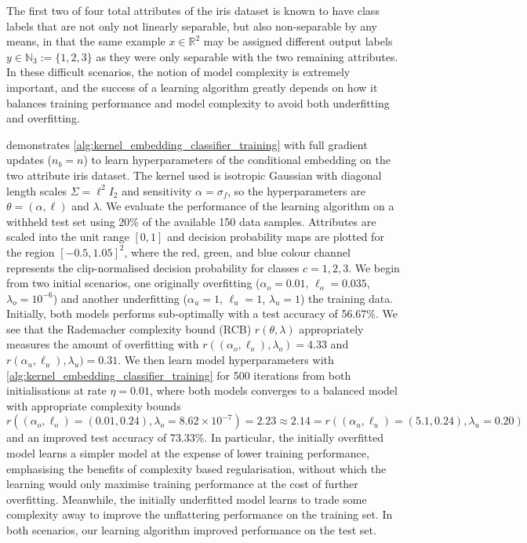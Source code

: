 \documentclass{article}
\begin{document}
		The first two of four total attributes of the iris dataset \citep{fisher1936use} is known to have class labels that are not only not linearly separable, but also non-separable by any means, in that the same example $x \in \mathbb{R}^{2}$ may be assigned different output labels $y \in \mathbb{N}_{3} := \{1, 2, 3\}$ as they were only separable with the two remaining attributes. In these difficult scenarios, the notion of model complexity is extremely important, and the success of a learning algorithm greatly depends on how it balances training performance and model complexity to avoid both underfitting and overfitting. 
		
		 demonstrates \cref{alg:kernel_embedding_classifier_training} with full gradient updates ($n_{b} = n$) to learn hyperparameters of the conditional embedding on the two attribute iris dataset. The kernel used is isotropic Gaussian with diagonal length scales $\Sigma = \ell^{2} I_{2}$ and sensitivity $\alpha = \sigma_{f}$, so the hyperparameters are $\theta = (\alpha, \ell)$ and $\lambda$. We evaluate the performance of the learning algorithm on a withheld test set using 20\% of the available 150 data samples. Attributes are scaled into the unit range $[0, 1]$ and decision probability maps are plotted for the region $[-0.5, 1.05]^{2}$, where the red, green, and blue colour channel represents the clip-normalised decision probability for classes $c = 1, 2, 3$. We begin from two initial scenarios, one originally overfitting ($\alpha_{o} = 0.01$, $\ell_{o} = 0.035$, $\lambda_{o} = 10^{-6}$) and another underfitting ($\alpha_{u} = 1$, $\ell_{u} = 1$, $\lambda_{u} = 1$) the training data. Initially, both models performs sub-optimally with a test accuracy of 56.67\%. We see that the Rademacher complexity bound (RCB) $r(\theta, \lambda)$ appropriately measures the amount of overfitting with $r((\alpha_{o}, \ell_{o}), \lambda_{o}) = 4.33$ and $r(\alpha_{u}, \ell_{u}), \lambda_{u}) = 0.31$. We then learn model hyperparameters with \cref{alg:kernel_embedding_classifier_training} for 500 iterations from both initialisations at rate $\eta = 0.01$, where both models converges to a balanced model with appropriate complexity bounds $r((\alpha_{o}, \ell_{o}) = (0.01, 0.24), \lambda_{o} = 8.62 \times 10^{-7}) = 2.23 \approx 2.14 = r((\alpha_{u}, \ell_{u}) = (5.1, 0.24), \lambda_{u} = 0.20)$ and an improved test accuracy of 73.33\%. In particular, the initially overfitted model learns a simpler model at the expense of lower training performance, emphasising the benefits of complexity based regularisation, without which the learning would only maximise training performance at the cost of further overfitting. Meanwhile, the initially underfitted model learns to trade some complexity away to improve the unflattering performance on the training set. In both scenarios, our learning algorithm improved performance on the test set.
		
\end{document}
